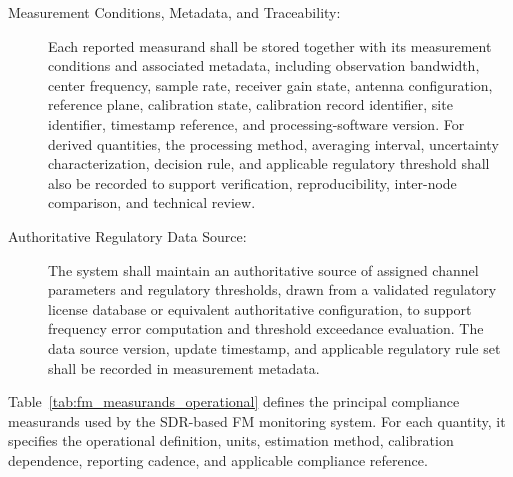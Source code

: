 \documentclass[11pt]{report}
\begin{document}
\begin{description}
	\item[Measurement Conditions, Metadata, and Traceability:]
	Each reported measurand shall be stored together with its measurement conditions and associated metadata, including observation bandwidth, center frequency, sample rate, receiver gain state, antenna configuration, reference plane, calibration state, calibration record identifier, site identifier, timestamp reference, and processing-software version. For derived quantities, the processing method, averaging interval, uncertainty characterization, decision rule, and applicable regulatory threshold shall also be recorded to support verification, reproducibility, inter-node comparison, and technical review.
	
	\item[Authoritative Regulatory Data Source:]
	The system shall maintain an authoritative source of assigned channel parameters and regulatory thresholds, drawn from a validated regulatory license database or equivalent authoritative configuration, to support frequency error computation and threshold exceedance evaluation. The data source version, update timestamp, and applicable regulatory rule set shall be recorded in measurement metadata.
	
\end{description}

Table~\ref{tab:fm_measurands_operational} defines the principal compliance measurands used by the SDR-based FM monitoring system. For each quantity, it specifies the operational definition, units, estimation method, calibration dependence, reporting cadence, and applicable compliance reference.
\end{document}
